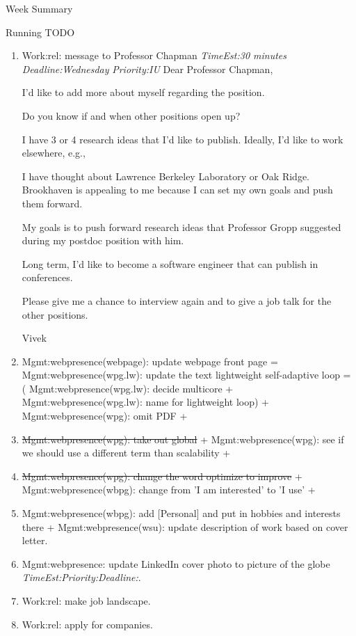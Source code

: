 \documentclass[serif, mathserif, final]{beamer}
\newcommand{\doneTask}[1]{\tiny \item \tiny \sout{#1}}
\newcommand{\te}[1]{\textit{TimeEst:}\textit{#1}}
\newcommand{\dl}[1]{\textit{Deadline:}\textit{#1}}
\newcommand{\pr}[1]{\textit{Priority:}\textit{#1}}
\begin{document}
\begin{frame}
\begin{columns}
\begin{column}{0.5\linewidth}
\begin{block}{Week Summary}
\begin{block}{Running TODO}
\begin{enumerate}
      \item \tiny Work:rel: message to Professor Chapman \te{30
        minutes} \dl{Wednesday} \pr{IU} 
        Dear Professor Chapman, 
        
        I'd like to add more about myself regarding the position. 

        Do you know if and when other positions open up?    

        I have 3 or 4 research ideas that I'd like to
        publish. Ideally, I'd like to work elsewhere, e.g., 

        I have thought about Lawrence Berkeley Laboratory or Oak
        Ridge. Brookhaven is appealing to me because I can set my own goals
        and push them forward. 

        My goals is to push forward research ideas that Professor
        Gropp suggested during my postdoc position with him. 
 
        Long term, I'd like to become a software 
        engineer that can publish in conferences.


        Please give me a chance to interview again and to give a job
        talk for the other positions.

        Vivek

    \item \tiny Mgmt:webpresence(webpage): update webpage front page =
      Mgmt:webpresence(wpg.lw): update the text lightweight self-adaptive
      loop = ( Mgmt:webpresence(wpg.lw): decide multicore +
      Mgmt:webpresence(wpg.lw): name for lightweight loop) +
      Mgmt:webpresence(wpg): omit PDF  + \doneTask{Mgmt:webpresence(wpg): take
      out global} +  Mgmt:webpresence(wpg): see if we should use a different term
      than scalability  + \doneTask{Mgmt:webpresence(wpg): change the word
      optimize to improve}  + Mgmt:webpresence(wbpg): change from 'I am
      interested' to 'I use' + 
    \item \tiny Mgmt:webpresence(wbpg): add [Personal] and put in hobbies and interests there  + 
      Mgmt:webpresence(wsu): update description of work based on cover
      letter. 

      \item \tiny Mgmt:webpresence: update LinkedIn cover photo to picture of the globe \te{}\pr{}\dl{}. 

      \item \tiny Work:rel: make job landscape.  
      \item \tiny Work:rel: apply for companies. 


\end{enumerate}
\end{block}
\end{block}
\end{column}
\end{columns}
\end{frame}
\end{document}
